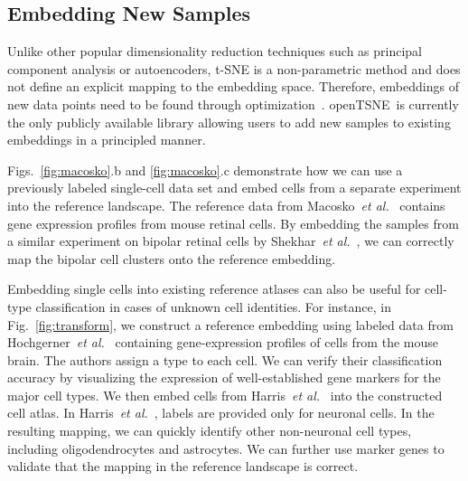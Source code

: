 \documentclass[twocolumn]{bmcart}
\newcommand{\opentsne}{\textsf{openTSNE}}
\begin{document}
\subsection*{Embedding New Samples}

Unlike other popular dimensionality reduction techniques such as principal
component analysis or autoencoders, t-SNE is a non-parametric method and does
not define an explicit mapping to the embedding space. Therefore, embeddings of
new data points need to be found through
optimization~\cite{policar2019embedding}. \opentsne\ is currently the only
publicly available library allowing users to add new samples to existing
embeddings in a principled manner.

Figs.~\ref{fig:macosko}.b and \ref{fig:macosko}.c demonstrate how we can use a
previously labeled single-cell data set and embed cells from a separate
experiment into the reference landscape. The reference data from
Macosko~\textit{et al.}~\cite{macosko2015highly} contains gene expression
profiles from mouse retinal cells. By embedding the samples from a similar
experiment on bipolar retinal cells by Shekhar~\textit{et
al.}~\cite{shekhar2016comprehensive}, we can correctly map the bipolar cell
clusters onto the reference embedding.

Embedding single cells into existing reference atlases can also be useful for
cell-type classification in cases of unknown cell identities. For instance, in
Fig.~\ref{fig:transform}, we construct a reference embedding using labeled data
from Hochgerner~\textit{et al.}~\cite{hochgerner2018conserved} containing
gene-expression profiles of cells from the mouse brain. The authors assign a
type to each cell. We can verify their classification accuracy by visualizing
the expression of well-established gene markers for the major cell types. We
then embed cells from Harris~\textit{et al.}~\cite{harris2018classes} into the
constructed cell atlas. In Harris~\textit{et al.}~, labels are provided only for
neuronal cells. In the resulting mapping, we can quickly identify other
non-neuronal cell types, including oligodendrocytes and astrocytes. We can
further use marker genes to validate that the mapping in the reference landscape
is correct. 
\end{document}
